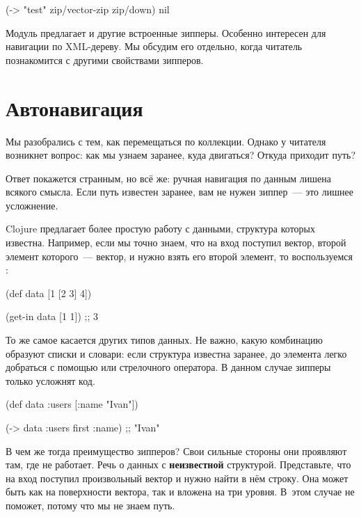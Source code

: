 \begin{english}
  \begin{clojure}
(-> "test"
    zip/vector-zip
    zip/down)
nil
  \end{clojure}
\end{english}

Модуль  предлагает и другие встроенные зипперы. Особенно интересен
 для навигации по XML-дереву. Мы обсудим его отдельно, когда читатель
познакомится с другими свойствами зипперов.

\section{Автонавигация}


Мы разобрались с тем, как перемещаться по коллекции. Однако у читателя возникнет
вопрос: как мы узнаем заранее, куда двигаться? Откуда приходит путь?

Ответ покажется странным, но всё же: ручная навигация по данным лишена всякого
смысла. Если путь известен заранее, вам не нужен зиппер~--- это лишнее
усложнение.

Clojure предлагает более простую работу с данными, структура которых
известна. Например, если мы точно знаем, что на вход поступил вектор, второй
элемент которого~--- вектор, и нужно взять его второй элемент, то воспользуемся
:

\begin{english}
  \begin{clojure}
(def data
  [1 [2 3] 4])

(get-in data [1 1])
;; 3
  \end{clojure}
\end{english}

То же самое касается других типов данных. Не важно, какую комбинацию образуют
списки и словари: если структура известна заранее, до элемента легко добраться с
помощью  или стрелочного оператора. В данном случае зипперы только
усложнят код.

\begin{english}
  \begin{clojure}
(def data
  {:users [{:name "Ivan"}]})

(-> data :users first :name)
;; "Ivan"
  \end{clojure}
\end{english}

В чем же тогда преимущество зипперов? Свои сильные стороны они проявляют там,
где  не работает. Речь о данных с \textbf{неизвестной}
структурой. Представьте, что на вход поступил произвольный вектор и нужно найти
в нём строку. Она может быть как на поверхности вектора, так и вложена на три
уровня. В~этом случае  не поможет, потому что мы не знаем путь.

